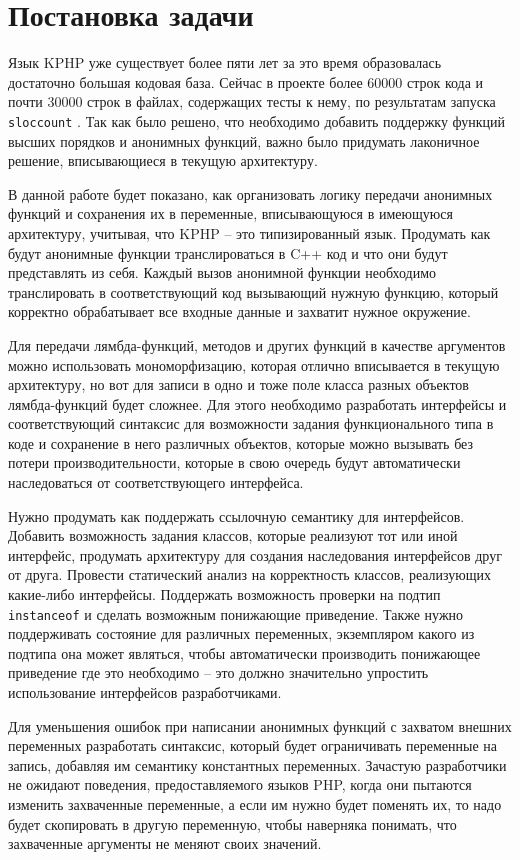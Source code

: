 
\startrelatedwork
\chapter{Постановка задачи}
Язык KPHP уже существует более пяти лет за это время образовалась достаточно большая кодовая база.
Сейчас в проекте более 60000 строк кода и почти 30000 строк в файлах, содержащих тесты к нему, по результатам запуска \verb|sloccount| \cite{sloccount}. Так как было решено, что необходимо добавить поддержку функций высших порядков и анонимных функций, важно было придумать лаконичное решение, вписывающиеся в текущую архитектуру.

В данной работе будет показано, как организовать логику передачи анонимных функций и сохранения их в переменные, вписывающуюся в имеющуюся архитектуру, учитывая, что KPHP -- это типизированный язык. Продумать как будут анонимные функции транслироваться в C++ код и что они будут представлять из себя. Каждый вызов анонимной функции необходимо транслировать в соответствующий код вызывающий нужную функцию, который корректно обрабатывает все входные данные и захватит нужное окружение.

Для передачи лямбда-функций, методов и других функций в качестве аргументов можно использовать мономорфизацию, которая отлично вписывается в текущую архитектуру, но вот для записи в одно и тоже поле класса разных объектов лямбда-функций будет сложнее. Для этого необходимо разработать интерфейсы и соответствующий синтаксис для возможности задания функционального типа в коде и сохранение в него различных объектов, которые можно вызывать без потери производительности, которые в свою очередь будут автоматически наследоваться от соответствующего интерфейса. 

Нужно продумать как поддержать ссылочную семантику для интерфейсов.
Добавить возможность задания классов, которые реализуют тот или иной интерфейс, продумать архитектуру для создания наследования интерфейсов друг от друга.
Провести статический анализ на корректность классов, реализующих какие-либо интерфейсы.
Поддержать возможность проверки на подтип \verb|instanceof| и сделать возможным понижающие приведение.
Также нужно поддерживать состояние для различных переменных, экземпляром какого из подтипа она может являться, чтобы автоматически производить понижающее приведение где это необходимо -- это должно значительно упростить использование интерфейсов разработчиками.

Для уменьшения ошибок при написании анонимных функций с захватом внешних переменных разработать синтаксис, который будет ограничивать переменные на запись, добавляя им семантику константных переменных.
Зачастую разработчики не ожидают поведения, предоставляемого языков PHP, когда они пытаются изменить захваченные переменные, а если им нужно будет поменять их, то надо будет скопировать в другую переменную, чтобы наверняка понимать, что захваченные аргументы не меняют своих значений.

